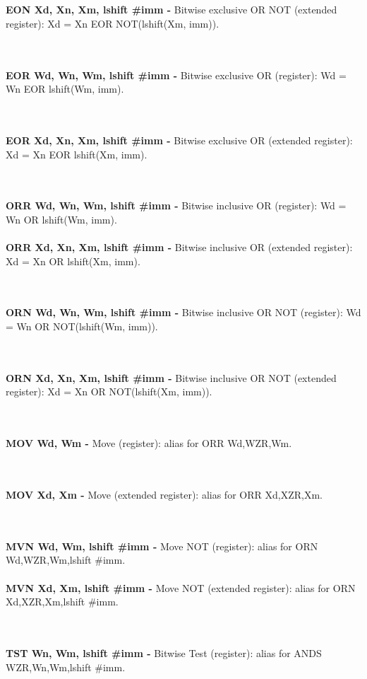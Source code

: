 \documentclass[12pt,a4paper,utf8]{ppgsi}
\begin{document}
\\\\\textbf{EON Xd, Xn, Xm{, lshift \#imm} -} Bitwise exclusive OR NOT (extended register): Xd = Xn EOR NOT(lshift(Xm, imm)). 

\\\\\textbf{EOR Wd, Wn, Wm{, lshift \#imm} -} Bitwise exclusive OR (register): Wd = Wn EOR lshift(Wm, imm). 

\\\\\textbf{EOR Xd, Xn, Xm{, lshift \#imm} -} Bitwise exclusive OR (extended register): Xd = Xn EOR lshift(Xm, imm). 

\\\\\textbf{ORR Wd, Wn, Wm{, lshift \#imm} -} Bitwise inclusive OR (register): Wd = Wn OR lshift(Wm, imm). 
\\\\\textbf{ORR Xd, Xn, Xm{, lshift \#imm} -} Bitwise inclusive OR (extended register): Xd = Xn OR lshift(Xm, imm). 

\\\\\textbf{ORN Wd, Wn, Wm{, lshift \#imm} -} Bitwise inclusive OR NOT (register): Wd = Wn OR NOT(lshift(Wm, imm)). 

\\\\\textbf{ORN Xd, Xn, Xm{, lshift \#imm} -} Bitwise inclusive OR NOT (extended register): Xd = Xn OR NOT(lshift(Xm, imm)). 

\\\\\textbf{MOV Wd, Wm -} Move (register): alias for ORR Wd,WZR,Wm. 

\\\\\textbf{MOV Xd, Xm -} Move (extended register): alias for ORR Xd,XZR,Xm. 

\\\\\textbf{MVN Wd, Wm{, lshift \#imm} -} Move NOT (register): alias for ORN Wd,WZR,Wm{,lshift \#imm}. 
\\\\\textbf{MVN Xd, Xm{, lshift \#imm} -} Move NOT (extended register): alias for ORN Xd,XZR,Xm{,lshift \#imm}. 

\\\\\textbf{TST Wn, Wm{, lshift \#imm} -} Bitwise Test (register): alias for ANDS WZR,Wn,Wm{,lshift \#imm}. 
\end{document}
